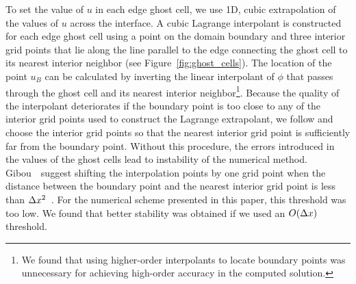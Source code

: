 \documentclass[oneeqnum,onefignum,onetabnum,onethmnum]{siamltex}
\begin{document}
To set the value of $u$ in each edge ghost cell, we use 1D, cubic 
extrapolation of the values of $u$ across the interface.  A cubic Lagrange 
interpolant is constructed for each edge ghost cell using a point on the 
domain boundary and three interior grid points that lie along the line 
parallel to the edge connecting the ghost cell to its nearest interior 
neighbor (see Figure~\ref{fig:ghost_cells}).  
The location of the point $u_B$ can be calculated by inverting the linear 
interpolant of $\phi$ that passes through the ghost cell and its nearest
interior neighbor\footnote{We found that using higher-order interpolants to 
locate boundary points was unnecessary for achieving high-order accuracy in 
the computed solution.}.  Because the quality of the interpolant deteriorates 
if the boundary point is too close to any of the interior grid points used to 
construct the Lagrange extrapolant, we follow \cite{gibou_2005} and choose the 
interior grid points so that the nearest interior grid point is sufficiently 
far from the boundary point.  Without this procedure, the errors introduced 
in the values of the ghost cells lead to instability of the numerical method.
Gibou~\etal~suggest shifting the interpolation points by one grid point 
when the distance between the boundary point and the nearest interior grid 
point is less than $\Delta x^2$~\cite{gibou_2005}.  For the numerical scheme 
presented in this paper, this threshold was too low.  We found that better 
stability was obtained if we used an $O(\Delta x)$ threshold.
\end{document}
